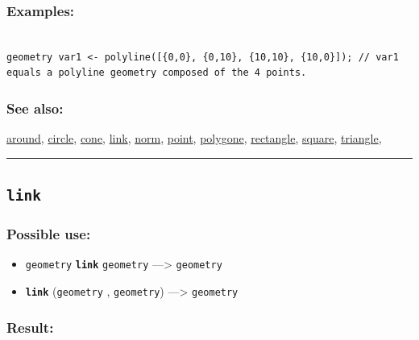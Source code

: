 \documentclass[]{book}
\providecommand{\tightlist}{%
  \setlength{\itemsep}{0pt}\setlength{\parskip}{0pt}}
\theoremstyle{definition}
\theoremstyle{definition}
\theoremstyle{definition}
\theoremstyle{remark}
\begin{document}
\subsubsection{Examples:}\label{examples-223}

\begin{verbatim}
 
geometry var1 <- polyline([{0,0}, {0,10}, {10,10}, {10,0}]); // var1 equals a polyline geometry composed of the 4 points.
\end{verbatim}

\subsubsection{See also:}\label{see-also-125}

\href{operators-a-to-a.html\#around}{around},
\href{operators-b-to-c.html\#circle}{circle},
\href{operators-b-to-c.html\#cone}{cone},
\href{operators-i-to-m.html\#link}{link},
\href{operators-n-to-r.html\#norm}{norm},
\href{operators-n-to-r.html\#point}{point},
\href{operators-s-to-z.html\#polygone}{polygone},
\href{operators-n-to-r.html\#rectangle}{rectangle},
\href{operators-s-to-z.html\#square}{square},
\href{operators-s-to-z.html\#triangle}{triangle},

\begin{center}\rule{0.5\linewidth}{\linethickness}\end{center}

\subsection{\texorpdfstring{\texttt{link}}{link}}\label{link}

\subsubsection{Possible use:}\label{possible-use-322}

\begin{itemize}
\tightlist
\item
  \texttt{geometry} \textbf{\texttt{link}} \texttt{geometry}
  ---\textgreater{} \texttt{geometry}
\item
  \textbf{\texttt{link}} (\texttt{geometry} , \texttt{geometry})
  ---\textgreater{} \texttt{geometry}
\end{itemize}

\subsubsection{Result:}\label{result-312}
\end{document}
